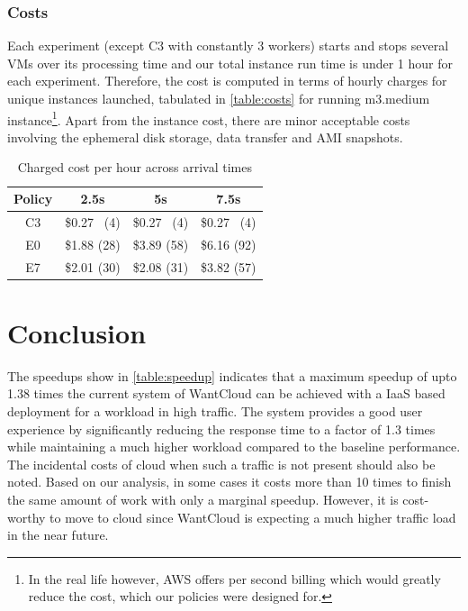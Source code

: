 \documentclass[a4paper]{IEEEtran}
\begin{document}
\subsubsection{Costs}

Each experiment (except C3 with constantly 3 workers) starts and stops several VMs over its processing time and our total instance run time is under 1 hour for each experiment. Therefore, the cost is computed in terms of hourly charges for unique instances launched, tabulated in \autoref{table:costs} for running m3.medium instance\footnote{In the real life however, AWS offers per second billing which would greatly reduce the cost, which our policies were designed for.}. Apart from the instance cost, there are minor acceptable costs involving the ephemeral disk storage, data transfer and AMI snapshots.

\begin{table}[hbp]
  \centering
  \caption{Charged cost per hour across arrival times}
  \label{table:costs}
  \begin{tabular}{|c|c|c|c|}
    \hline
    Policy & 2.5s & 5s & 7.5s \\
    \hline
    C3 & \$0.27 ~(4) & \$0.27 ~(4) & \$0.27 ~(4) \\
    E0 & \$1.88 (28) & \$3.89 (58) & \$6.16 (92) \\
    E7 & \$2.01 (30) & \$2.08 (31) & \$3.82 (57) \\
    \hline
  \end{tabular}
\end{table}

\section{Conclusion} \label{conclusion}

The speedups show in \autoref{table:speedup} indicates that a maximum speedup of upto 1.38 times the current
system of WantCloud can be achieved with a IaaS based deployment for a workload in high traffic. The system
provides a good user experience by significantly reducing the response time to a factor of 1.3 times while 
maintaining a much higher workload compared to the baseline performance. The incidental costs of cloud when such a traffic is not present should also be noted. Based on our analysis, in some cases it costs more than 10 times to finish the same amount of work with only a marginal speedup. However, it is cost-worthy to move to cloud since
WantCloud is expecting a much higher traffic load in the near future.
\end{document}
